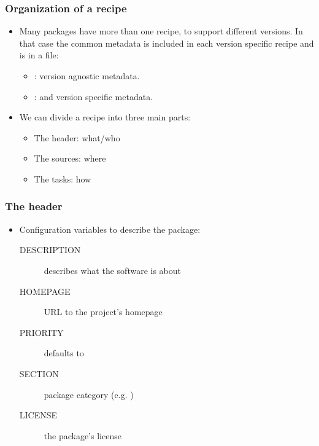 \begin{frame}
  \frametitle{Organization of a recipe}
  \begin{itemize}
    \item Many packages have more than one recipe, to support
      different versions. In that case the common metadata is
      included in each version specific recipe and is in a 
      file:
      \begin{itemize}
        \item {}: version agnostic metadata.
        \item {}:  and version specific metadata.
      \end{itemize}
    \item We can divide a recipe into three main parts:
      \begin{itemize}
        \item The header: what/who
        \item The sources: where
        \item The tasks: how
      \end{itemize}
  \end{itemize}
\end{frame}

\begin{frame}
  \frametitle{The header}
  \begin{itemize}
    \item Configuration variables to describe the package:
      \begin{description}
        \item[DESCRIPTION] describes what the software is about
        \item[HOMEPAGE] URL to the project's homepage
        \item[PRIORITY] defaults to 
        \item[SECTION] package category (e.g. )
        \item[LICENSE] the package's license
      \end{description}
  \end{itemize}
\end{frame}

